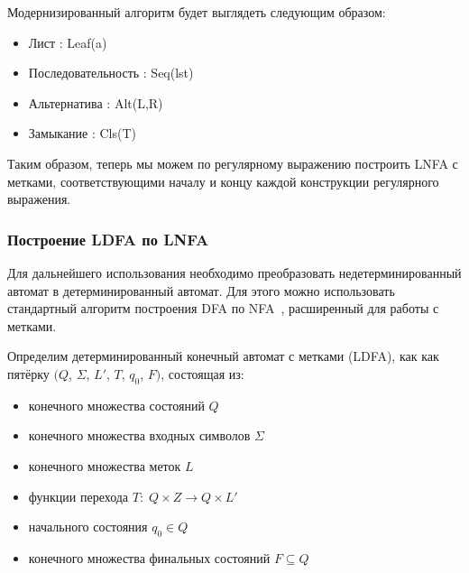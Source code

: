Модернизированный алгоритм будет выглядеть следующим образом:
  \begin{itemize}
    \item
      Лист : Leaf(a) \
      \begin{flushleft}
        
      \end{flushleft}
    \item 
      Последовательность : Seq(lst) \
      \begin{flushleft}
        
      \end{flushleft}
    \item 
      Альтернатива : Alt(L,R) \
      \begin{flushleft}
        
      \end{flushleft}
    \item 
      Замыкание : Cls(T) \
      \begin{flushleft}
        
      \end{flushleft}
  \end{itemize}

Таким образом, теперь мы можем по регулярному выражению построить LNFA с метками, соответствующими началу и концу каждой конструкции регулярного выражения.


\subsubsection{Построение LDFA по LNFA}

Для дальнейшего использования необходимо преобразовать недетерминированный автомат в детерминированный автомат. Для этого можно использовать стандартный алгоритм построения DFA по NFA~\cite{DrgBook}, расширенный для работы с метками.

Определим детерминированный конечный автомат с метками (LDFA), как как пятёрку $(Q$, $\Sigma$, $L'$, $T$, $q_0$, $F)$, состоящая из:
\begin{itemize}
	\item конечного множества состояний $Q$ 
	\item конечного множества входных символов $\Sigma$ 
	\item конечного множества меток $L$ 
	\item функции перехода $T: \; Q \times Z \rightarrow Q \times L'$
	\item начального состояния $q_0 \in Q$
	\item конечного множества финальных состояний $F \subseteq Q$ 
\end{itemize}

